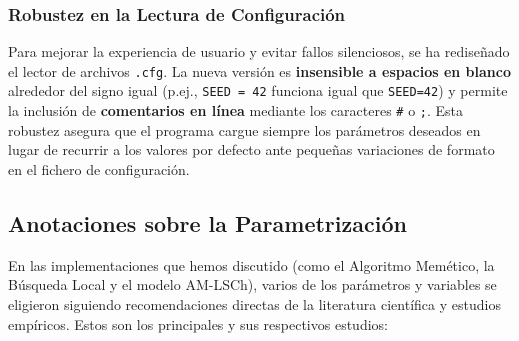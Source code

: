 \subsubsection{Robustez en la Lectura de Configuración}


Para mejorar la experiencia de usuario y evitar fallos silenciosos, se ha rediseñado el lector de archivos \texttt{.cfg}. La nueva versión es \textbf{insensible a espacios en blanco} alrededor del signo igual (p.ej., \texttt{SEED = 42} funciona igual que \texttt{SEED=42}) y permite la inclusión de \textbf{comentarios en línea} mediante los caracteres \texttt{\#} o \texttt{;}. Esta robustez asegura que el programa cargue siempre los parámetros deseados en lugar de recurrir a los valores por defecto ante pequeñas variaciones de formato en el fichero de configuración.

\subsection{Anotaciones sobre la Parametrización}

En las implementaciones que hemos discutido (como el Algoritmo Memético, la Búsqueda Local y el modelo AM-LSCh), varios de los parámetros y variables se eligieron siguiendo recomendaciones directas de la literatura científica y estudios empíricos. Estos son los principales y sus respectivos estudios:

